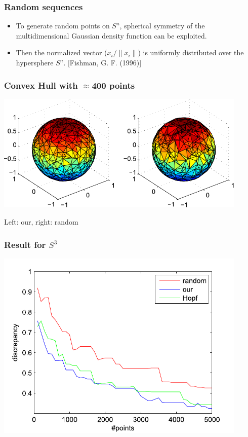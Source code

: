 \documentclass[serif]{beamer} %
\begin{document}
\begin{frame}
  \frametitle{Random sequences}
  \begin{itemize}
    \item To generate random points on $S^n$, spherical symmetry of the multidimensional Gaussian density function can be exploited.
    \item Then the normalized vector ($x_i/\|x_i\|$) is uniformly distributed over the hypersphere $S^n$. [Fishman, G. F. (1996)]
  \end{itemize}
\end{frame}


\begin{frame}
  \frametitle{Convex Hull with $\approx$400 points}
  \centerline{\includegraphics[width=0.9\textwidth]{res_compare.pdf}}
  Left: our, right: random
\end{frame}


\begin{frame}
  \frametitle{Result for $S^3$}
  \centerline{\includegraphics[width=0.9\textwidth]{res_hopf.pdf}}
\end{frame}
\end{document}
